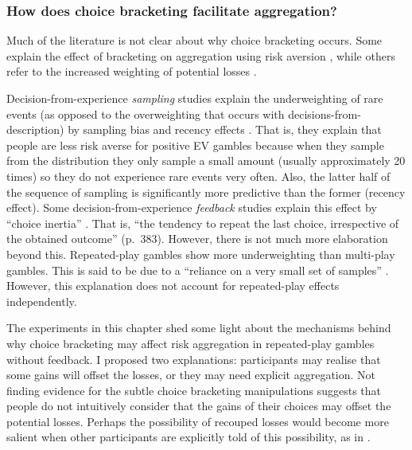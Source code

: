 \documentclass[a4paper, nobind, dvipsnames]{templates/ociamthesis}
\theoremstyle{definition}
\theoremstyle{definition}
\theoremstyle{definition}
\theoremstyle{definition}
\theoremstyle{remark}
\begin{document}
\hypertarget{how-does-choice-bracketing-facilitate-aggregation}{%
\subsubsection{How does choice bracketing facilitate aggregation?}\label{how-does-choice-bracketing-facilitate-aggregation}}

Much of the literature \autocite[e.g.,][]{benartzi1999} is not clear about why choice
bracketing occurs. Some explain the effect of bracketing on aggregation using
risk aversion \autocite[e.g.,][]{read1999}, while others refer to the increased weighting
of potential losses \autocite{webb2017}.

Decision-from-experience \emph{sampling} studies explain the underweighting of rare
events (as opposed to the overweighting that occurs with
decisions-from-description) by sampling bias and recency effects \autocites[e.g.,][]{hertwig2004,wulff2018}. That is, they explain that people are less risk
averse for positive EV gambles because when they sample from the distribution
they only sample a small amount (usually approximately 20 times) so they do not
experience rare events very often. Also, the latter half of the sequence of
sampling is significantly more predictive than the former (recency effect). Some
decision-from-experience \emph{feedback} studies explain this effect by ``choice
inertia'' \autocite{camilleri2011}. That is, ``the tendency to repeat the last choice,
irrespective of the obtained outcome'' (p.~383). However, there is not much more
elaboration beyond this. Repeated-play gambles show more underweighting than
multi-play gambles. This is said to be due to a ``reliance on a very small set of
samples'' \autocite[p.~64]{camilleri2013}. However, this explanation does not account
for repeated-play effects independently.

The experiments in this chapter shed some light about the mechanisms behind why
choice bracketing may affect risk aggregation in repeated-play gambles without
feedback. I proposed two explanations: participants may realise that some gains
will offset the losses, or they may need explicit aggregation. Not finding
evidence for the subtle choice bracketing manipulations suggests that people do
not intuitively consider that the gains of their choices may offset the
potential losses. Perhaps the possibility of recouped losses would become more
salient when other participants are explicitly told of this possibility, as in
\textcite{sokolhessner2009}.
\end{document}
